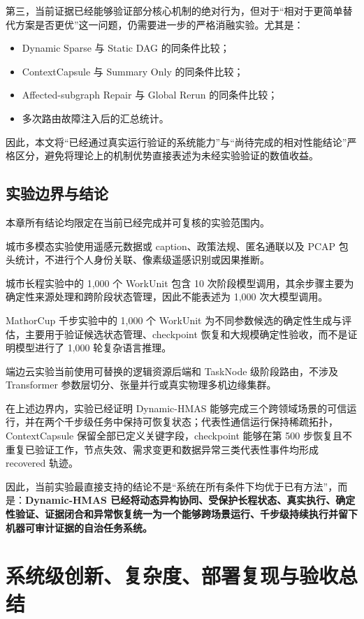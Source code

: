 \documentclass[UTF8,a4paper,12pt,oneside]{ctexbook}
\begin{document}
第三，当前证据已经能够验证部分核心机制的绝对行为，但对于“相对于更简单替代方案是否更优”这一问题，仍需要进一步的严格消融实验。尤其是：

\begin{itemize}
    \item Dynamic Sparse 与 Static DAG 的同条件比较；
    \item ContextCapsule 与 Summary Only 的同条件比较；
    \item Affected-subgraph Repair 与 Global Rerun 的同条件比较；
    \item 多次路由故障注入后的汇总统计。
\end{itemize}

因此，本文将“已经通过真实运行验证的系统能力”与“尚待完成的相对性能结论”严格区分，避免将理论上的机制优势直接表述为未经实验验证的数值收益。


\section{实验边界与结论}

本章所有结论均限定在当前已经完成并可复核的实验范围内。

城市多模态实验使用遥感元数据或 caption、政策法规、匿名通联以及 PCAP 包头统计，不进行个人身份关联、像素级遥感识别或因果推断。

城市长程实验中的 1,000 个 WorkUnit 包含 10 次阶段模型调用，其余步骤主要为确定性来源处理和跨阶段状态管理，因此不能表述为 1,000 次大模型调用。

MathorCup 千步实验中的 1,000 个 WorkUnit 为不同参数候选的确定性生成与评估，主要用于验证候选状态管理、checkpoint 恢复和大规模确定性验收，而不是证明模型进行了 1,000 轮复杂语言推理。

端边云实验当前使用可替换的逻辑资源后端和 TaskNode 级阶段路由，不涉及 Transformer 参数层切分、张量并行或真实物理多机边缘集群。

在上述边界内，实验已经证明 Dynamic-HMAS 能够完成三个跨领域场景的可信运行，并在两个千步级任务中保持可恢复状态；代表性通信运行保持稀疏拓扑，ContextCapsule 保留全部已定义关键字段，checkpoint 能够在第 500 步恢复且不重复已验证工作，节点失效、需求变更和数据异常三类代表性事件均形成 recovered 轨迹。

因此，当前实验最直接支持的结论不是“系统在所有条件下均优于已有方法”，而是：\textbf{Dynamic-HMAS 已经将动态异构协同、受保护长程状态、真实执行、确定性验证、证据闭合和异常恢复统一为一个能够跨场景运行、千步级持续执行并留下机器可审计证据的自治任务系统。}
\chapter{系统级创新、复杂度、部署复现与验收总结}
\end{document}

